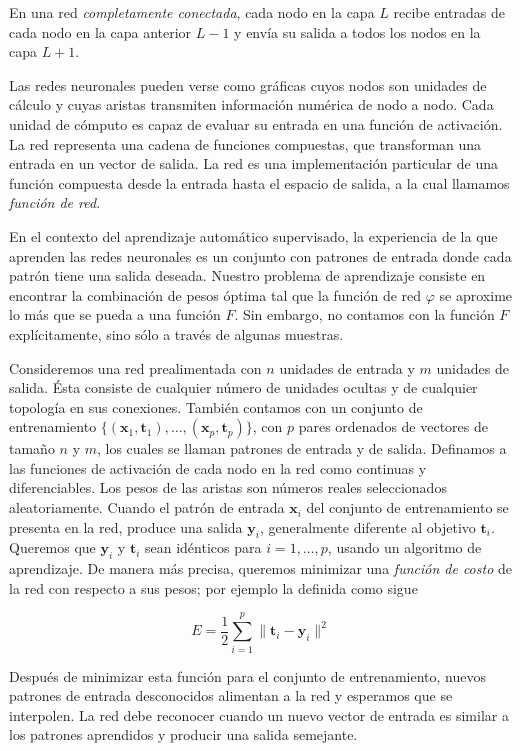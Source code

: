 \begin{remark}
En una red \textit{completamente conectada}, cada nodo en la capa $L$
recibe entradas de cada nodo en la capa anterior $L-1$ y envía su salida
a todos los nodos en la capa $L+1$.
\end{remark}

Las redes neuronales pueden verse como
gráficas cuyos nodos son unidades de cálculo y cuyas aristas
transmiten información numérica de nodo a nodo. Cada unidad de cómputo es capaz de evaluar su entrada
en una función de activación. La red representa una cadena de funciones compuestas,
que transforman una entrada en un vector de salida. La red es una implementación
particular de una función compuesta desde la entrada hasta el espacio de salida,
a la cual llamamos \textit{función de red}.

En el contexto del aprendizaje automático supervisado,
la experiencia de la que aprenden las redes neuronales es un conjunto 
con patrones de entrada donde cada patrón tiene una salida deseada.
Nuestro problema de aprendizaje consiste
en encontrar la combinación de pesos óptima tal que la función de red 
$\varphi$ se aproxime lo más que se pueda a una función $F$. Sin embargo,
no contamos con la función $F$ explícitamente, sino sólo a través de algunas muestras.

Consideremos una red prealimentada 
con $n$ unidades de entrada y $m$
unidades de salida. Ésta consiste de cualquier número de unidades ocultas
y de cualquier topología en sus conexiones. También contamos
con un conjunto de entrenamiento 
$\{(\mathbf{x}_1, \mathbf{t}_1), \dots, (\mathbf{x}_p, \mathbf{t}_p)\}$, con $p$ pares ordenados de vectores de tamaño $n$ y $m$, los cuales se llaman patrones de entrada y de salida.
Definamos a las funciones de activación de cada nodo en la red como
continuas y diferenciables. Los pesos de las aristas son números reales 
seleccionados aleatoriamente. Cuando el patrón de entrada $\mathbf{x}_i$
del conjunto de entrenamiento se presenta en la red, produce una salida 
$\mathbf{y}_i$, generalmente diferente al objetivo $\mathbf{t}_i$.
Queremos que $\mathbf{y}_i$ y $\mathbf{t}_i$ sean idénticos para
$i = 1, \dots, p$, usando un algoritmo de aprendizaje. De manera
más precisa, queremos minimizar una \textit{función de costo} de la red
con respecto a sus pesos;
por ejemplo la definida como sigue

\[
E = \frac{1}{2} \sum_{i=1}^p \|\mathbf{t}_i - \mathbf{y}_i\|^2
\]


Después de minimizar esta función para el conjunto de entrenamiento, nuevos patrones 
de entrada desconocidos alimentan a la red y esperamos que se interpolen. La red debe reconocer
cuando un nuevo vector de entrada es similar a los patrones aprendidos y producir una salida 
semejante.



